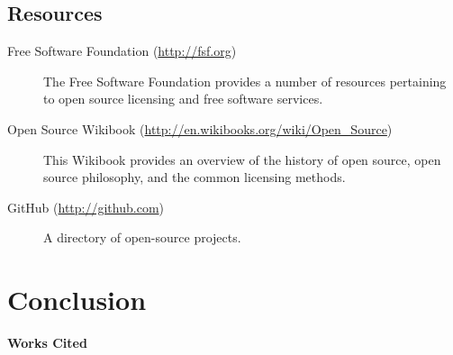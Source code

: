 \documentclass[12pt,letterpaper]{article}
\newenvironment{workscited}{\newpage\begin{center} \Large\bfseries Works Cited \end{center} \doublespacing}{\newpage}
\begin{document}
\subsection{Resources}
\begin{description}
  \item[Free Software Foundation (\url{http://fsf.org})] The Free Software
    Foundation provides a number of resources pertaining to open source
    licensing and free software services.
  \item[Open Source Wikibook (\url{http://en.wikibooks.org/wiki/Open_Source})]
    This Wikibook provides an overview of the history of open source, open
    source philosophy, and the common licensing methods.
  \item[GitHub (\url{http://github.com})] A directory of open-source projects.
\end{description}

\section{Conclusion}

\begin{workscited}

\end{workscited}
\end{document}
